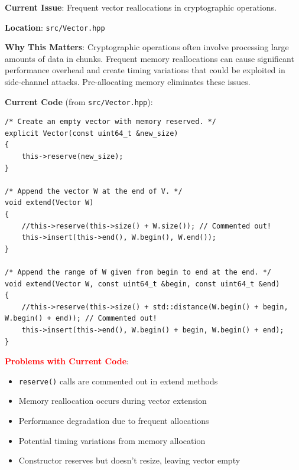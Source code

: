 \documentclass[11pt,a4paper]{article}
\begin{document}
\textbf{Current Issue}: Frequent vector reallocations in cryptographic operations.

\textbf{Location}: \texttt{src/Vector.hpp}

\textbf{Why This Matters}: Cryptographic operations often involve processing large amounts of data in chunks. Frequent memory reallocations can cause significant performance overhead and create timing variations that could be exploited in side-channel attacks. Pre-allocating memory eliminates these issues.

\textbf{Current Code} (from \texttt{src/Vector.hpp}):
\begin{lstlisting}
/* Create an empty vector with memory reserved. */
explicit Vector(const uint64_t &new_size)
{
    this->reserve(new_size);
}

/* Append the vector W at the end of V. */
void extend(Vector W)
{
    //this->reserve(this->size() + W.size()); // Commented out!
    this->insert(this->end(), W.begin(), W.end());
}

/* Append the range of W given from begin to end at the end. */
void extend(Vector W, const uint64_t &begin, const uint64_t &end)
{
    //this->reserve(this->size() + std::distance(W.begin() + begin, W.begin() + end)); // Commented out!
    this->insert(this->end(), W.begin() + begin, W.begin() + end);
}
\end{lstlisting}

\textcolor{red}{\textbf{Problems with Current Code}}:
\begin{itemize}
    \item \texttt{reserve()} calls are commented out in extend methods
    \item Memory reallocation occurs during vector extension
    \item Performance degradation due to frequent allocations
    \item Potential timing variations from memory allocation
    \item Constructor reserves but doesn't resize, leaving vector empty
\end{itemize}
\end{document}
